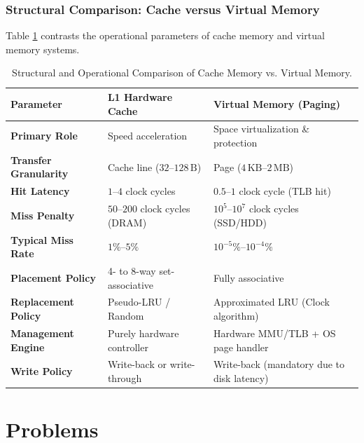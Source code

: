 \subsubsection{Structural Comparison: Cache versus Virtual Memory}
Table \ref{tab:cache_vs_vm} contrasts the operational parameters of cache memory and virtual memory systems.

\begin{table}[H]
  \begin{center}
    \caption{Structural and Operational Comparison of Cache Memory vs. Virtual Memory.}
    \label{tab:cache_vs_vm}
    \small
    \begin{tabular}{|l|l|l|}
      \hline
      \textbf{Parameter} & \textbf{L1 Hardware Cache} & \textbf{Virtual Memory (Paging)} \\ \hline \hline
      \textbf{Primary Role}        & Speed acceleration        & Space virtualization \& protection \\ \hline
      \textbf{Transfer Granularity}& Cache line ($32\text{--}128\,\text{B}$) & Page ($4\,\text{KB}\text{--}2\,\text{MB}$) \\ \hline
      \textbf{Hit Latency}         & $1\text{--}4$ clock cycles   & $0.5\text{--}1$ clock cycle (TLB hit) \\ \hline
      \textbf{Miss Penalty}        & $50\text{--}200$ clock cycles (DRAM) & $10^5\text{--}10^7$ clock cycles (SSD/HDD) \\ \hline
      \textbf{Typical Miss Rate}   & $1\%\text{--}5\%$            & $10^{-5}\%\text{--}10^{-4}\%$ \\ \hline
      \textbf{Placement Policy}    & 4- to 8-way set-associative & Fully associative \\ \hline
      \textbf{Replacement Policy}  & Pseudo-LRU / Random       & Approximated LRU (Clock algorithm) \\ \hline
      \textbf{Management Engine}   & Purely hardware controller& Hardware MMU/TLB + OS page handler \\ \hline
      \textbf{Write Policy}        & Write-back or write-through & Write-back (mandatory due to disk latency) \\ \hline
    \end{tabular}
  \end{center}
\end{table}


\section{Problems}

